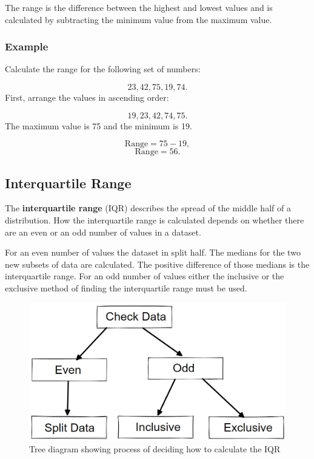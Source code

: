 \documentclass[
]{book}
\begin{document}
The range is the difference between the highest and lowest values and is calculated by subtracting the minimum value from the maximum value.

\hypertarget{example-7}{%
\subsubsection{Example}\label{example-7}}

Calculate the range for the following set of numbers:

\[ 23, 42, 75, 19, 74. \]
First, arrange the values in ascending order:

\[ 19, 23, 42, 74, 75. \]
The maximum value is 75 and the minimum is 19.

\[ \textrm{Range}= 75 - 19, \]
\[ \textrm{Range} = 56.\]

\hypertarget{interquartile-range}{%
\subsection{Interquartile Range}\label{interquartile-range}}

The \textbf{interquartile range} (IQR) describes the spread of the middle half of a distribution. How the interquartile range is calculated depends on whether there are an even or an odd number of values in a dataset.

For an even number of values the dataset in split half. The medians for the two new subsets of data are calculated. The positive difference of those medians is the interquartile range.
For an odd number of values either the inclusive or the exclusive method of finding the interquartile range must be used.

\begin{figure}
\centering
\includegraphics{iqrtree.jpg}
\caption{Tree diagram showing process of deciding how to calculate the IQR}
\end{figure}
\end{document}
